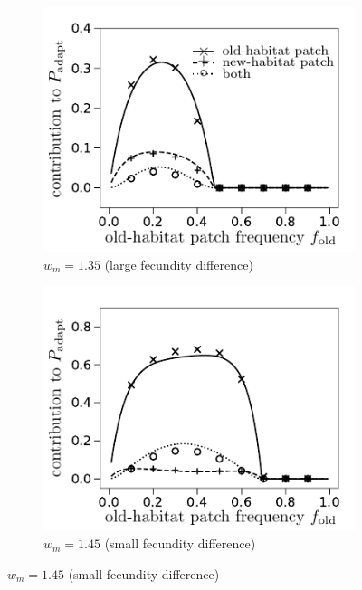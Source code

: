 \documentclass[a4paper,11pt]{article}
\begin{document}
\begin{figure}[t!]
	\centering
	\begin{subfigure}{.5\textwidth}
 		 \centering
 		 \includegraphics[width=\linewidth]{fig4a.pdf}
  		\caption{$w_m = 1.35$ (large fecundity difference)}
	\end{subfigure}%
	\begin{subfigure}{.5\textwidth}
  		\centering
  		\includegraphics[width=\linewidth]{fig4b.pdf}
  		\caption{$w_m = 1.45$ (small fecundity difference)}
	\end{subfigure}

\end{figure}
\end{document}

